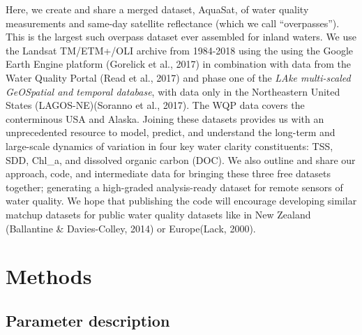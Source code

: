 \documentclass[]{article}
\begin{document}
Here, we create and share a merged dataset, AquaSat, of water quality
measurements and same-day satellite reflectance (which we call
``overpasses''). This is the largest such overpass dataset ever
assembled for inland waters. We use the Landsat TM/ETM+/OLI archive from
1984-2018 using the using the Google Earth Engine platform (Gorelick et
al., 2017) in combination with data from the Water Quality Portal (Read
et al., 2017) and phase one of the \emph{LAke multi-scaled GeOSpatial
and temporal database}, with data only in the Northeastern United States
(LAGOS-NE)(Soranno et al., 2017). The WQP data covers the conterminous
USA and Alaska. Joining these datasets provides us with an unprecedented
resource to model, predict, and understand the long-term and large-scale
dynamics of variation in four key water clarity constituents: TSS, SDD,
Chl\_a, and dissolved organic carbon (DOC). We also outline and share
our approach, code, and intermediate data for bringing these three free
datasets together; generating a high-graded analysis-ready dataset for
remote sensors of water quality. We hope that publishing the code will
encourage developing similar matchup datasets for public water quality
datasets like in New Zealand (Ballantine \& Davies-Colley, 2014) or
Europe(Lack, 2000).

\hypertarget{methods}{%
\section{Methods}\label{methods}}

\hypertarget{parameter-description}{%
\subsection{Parameter description}\label{parameter-description}}
\end{document}
